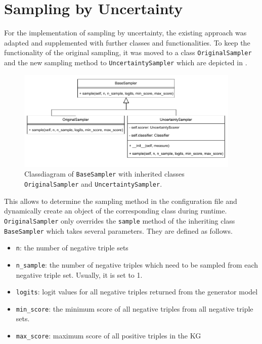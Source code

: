 \section{Sampling by Uncertainty}
\label{sec:sampling_by_uncertainty}
For the implementation of sampling by uncertainty, the existing approach was adapted and supplemented with further classes and functionalities.
To keep the functionality of the original sampling, it was moved to a class \texttt{OriginalSampler} and the new sampling method to \texttt{UncertaintySampler} which are depicted in .
\begin{figure}[H]
  \centering
    \includegraphics[width=0.95\textwidth]{figures/classdiagrams/BaseSampler.pdf}
    \caption{Classdiagram of \texttt{BaseSampler} with inherited classes \texttt{OriginalSampler} and \texttt{UncertaintySampler}.}
  \label{fig:base_sampler}
\end{figure}
This allows to determine the sampling method in the configuration file and dynamically create an object of the corresponding class during runtime.
\texttt{OriginalSampler} only overrides the \texttt{sample} method of 
the inheriting class \texttt{BaseSampler} which takes several parameters.
They are defined as follows.
\begin{itemize}
    \item 
    \texttt{n}: the number of negative triple sets
    
    \item 
    \texttt{n\_sample}: 
    the number of negative triples which need to be sampled from each negative triple set.
    Usually, it is set to 1.
    
    \item 
    \texttt{logits}:
    logit values for all negative triples returned from the generator model
    
    \item 
    \texttt{min\_score}:
    the minimum score of all negative triples from all negative triple sets.
    
    \item 
    \texttt{max\_score}:
    maximum score of all positive triples in the \ac{KG}
\end{itemize}

